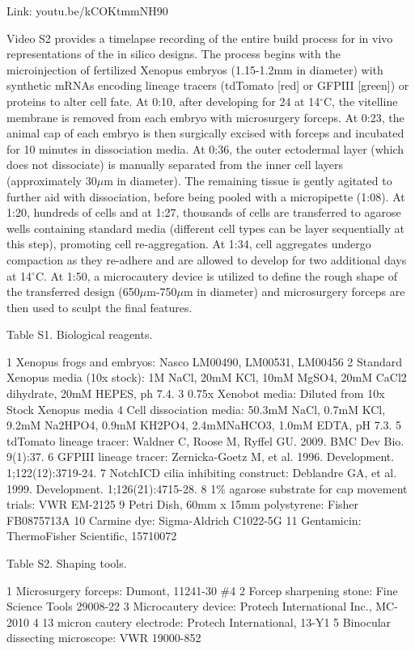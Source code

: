 Link:  youtu.be/kCOKtmmNH90

Video S2 provides a timelapse recording of the entire build process for in vivo representations of the in silico designs. The process begins with the microinjection of fertilized Xenopus embryos (1.15-1.2mm in diameter) with synthetic mRNAs encoding lineage tracers (tdTomato [red] or GFPIII [green]) or proteins to alter cell fate. At 0:10, after developing for 24 at 14{$^{\circ}$}C, the vitelline membrane is removed from each embryo with microsurgery forceps. At 0:23, the animal cap of each embryo is then surgically excised with forceps and incubated for 10 minutes in dissociation media. At 0:36, the outer ectodermal layer (which does not dissociate) is manually separated from the inner cell layers (approximately 30{$\mu$}m in diameter). The remaining tissue is gently agitated to further aid with dissociation, before being pooled with a micropipette (1:08). At 1:20, hundreds of cells and at 1:27, thousands of cells are transferred to agarose wells containing standard media (different cell types can be layer sequentially at this step), promoting cell re-aggregation. At 1:34, cell aggregates undergo compaction as they re-adhere and are allowed to develop for two additional days at 14{$^{\circ}$}C. At 1:50, a microcautery device is utilized to define the rough shape of the transferred design (650{$\mu$}m-750{$\mu$}m in diameter) and microsurgery forceps are then used to sculpt the final features.


Table S1. Biological reagents.

1
Xenopus frogs and embryos:
Nasco LM00490, LM00531, LM00456
2
Standard Xenopus media (10x stock): 
1M NaCl, 20mM KCl, 10mM MgSO4, 20mM CaCl2 dihydrate, 20mM HEPES, ph 7.4.
3
0.75x Xenobot media: 
Diluted from 10x Stock Xenopus media
4
Cell dissociation media: 
50.3mM NaCl, 0.7mM KCl, 9.2mM Na2HPO4, 0.9mM KH2PO4, 2.4mMNaHCO3, 1.0mM EDTA, pH 7.3.
5
tdTomato lineage tracer: 
Waldner C, Roose M, Ryffel GU. 2009. BMC Dev Bio. 9(1):37.
6
GFPIII lineage tracer: 
Zernicka-Goetz M, et al. 1996. Development. 1;122(12):3719-24.
7
NotchICD cilia inhibiting construct: 
Deblandre GA, et al. 1999. Development. 1;126(21):4715-28.
8
1\% agarose substrate for cap movement trials: 
VWR EM-2125
9
Petri Dish, 60mm x 15mm polystyrene: 
Fisher FB0875713A
10
Carmine dye: 
Sigma-Aldrich C1022-5G
11
Gentamicin: 
ThermoFisher Scientific, 15710072

Table S2. Shaping tools.

1
Microsurgery forceps: 
Dumont, 11241-30 \#4
2
Forcep sharpening stone: 
Fine Science Tools 29008-22
3
Microcautery device: 
Protech International Inc., MC-2010
4
13 micron cautery electrode: 
Protech International, 13-Y1
5
Binocular dissecting microscope:
VWR 19000-852



